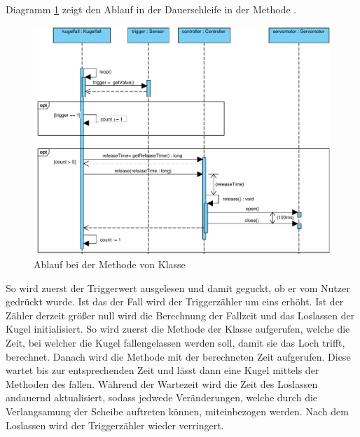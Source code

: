Diagramm \ref{fig:loop_diagram} zeigt den Ablauf in der Dauerschleife in der Methode .
\begin{figure}[htbp]
	\centering
	\includegraphics[width=\textwidth]{abb/loop_cropped}
	\caption{Ablauf bei der Methode  von Klasse }
	\label{fig:loop_diagram}
\end{figure}
So wird zuerst der Triggerwert ausgelesen und damit geguckt, ob er vom Nutzer gedrückt wurde.
Ist das der Fall wird der Triggerzähler um eins erhöht.
Ist der Zähler derzeit größer null wird die Berechnung der Fallzeit und das Loslassen der Kugel initialisiert.
So wird zuerst die Methode  der Klasse  aufgerufen, welche die Zeit, bei welcher die Kugel fallengelassen werden soll, damit sie das Loch trifft, berechnet.
Danach wird die Methode  mit der berechneten Zeit aufgerufen.
Diese wartet bis zur entsprechenden Zeit und lässt dann eine Kugel mittels der Methoden des  fallen.
Während der Wartezeit wird die Zeit des Loslassen andauernd aktualisiert, sodass jedwede Veränderungen, welche durch die Verlangsamung der Scheibe auftreten können, miteinbezogen werden.
Nach dem Loslassen wird der Triggerzähler wieder verringert.


